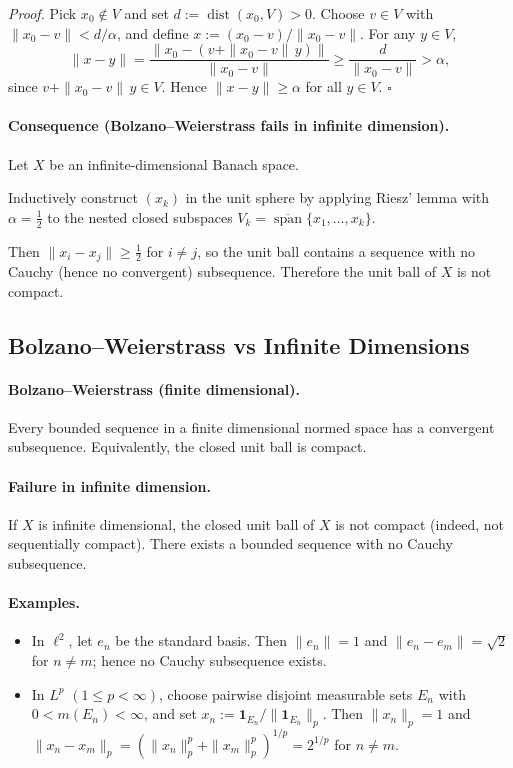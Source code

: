 \documentclass[12pt,a4paper]{article}
\newcommand{\qed}{\hfill$\square$}
\theoremstyle{plain}
\theoremstyle{definition}
\theoremstyle{remark}
\theoremstyle{remark}
\theoremstyle{definition}
\begin{document}
	\emph{Proof.}
	Pick $x_{0}\notin V$ and set $d:=\operatorname{dist}(x_{0},V)>0$.
	Choose $v\in V$ with $\|x_{0}-v\|<d/\alpha$, and define $x:=(x_{0}-v)/\|x_{0}-v\|$.
	For any $y\in V$,
	\[
	\|x-y\|
	=\frac{\|x_{0}-(v+\|x_{0}-v\|\,y)\|}{\|x_{0}-v\|}
	\ge \frac{d}{\|x_{0}-v\|}>\alpha,
	\]
	since $v+\|x_{0}-v\|\,y\in V$. Hence $\|x-y\|\ge\alpha$ for all $y\in V$.
	\qed
	
	\paragraph{Consequence (Bolzano--Weierstrass fails in infinite dimension).}
	Let $X$ be an infinite-dimensional Banach space.
	
	Inductively construct $(x_{k})$ in the unit sphere by applying Riesz' lemma with $\alpha=\tfrac12$
	to the nested closed subspaces $V_{k}=\overline{\operatorname{span}}\{x_{1},\dots,x_{k}\}$.
	
	Then $\|x_{i}-x_{j}\|\ge\tfrac12$ for $i\ne j$, so the unit ball contains a sequence with no
	Cauchy (hence no convergent) subsequence. Therefore the unit ball of $X$ is not compact.
	
	\subsection*{Bolzano--Weierstrass vs Infinite Dimensions}
	
	\paragraph{Bolzano--Weierstrass (finite dimensional).}
	Every bounded sequence in a finite dimensional normed space has a convergent subsequence.
	Equivalently, the closed unit ball is compact.
	
	\paragraph{Failure in infinite dimension.}
	If $X$ is infinite dimensional, the closed unit ball of $X$ is not compact (indeed, not sequentially compact).
	There exists a bounded sequence with no Cauchy subsequence.
	
	\paragraph{Examples.}
	\begin{itemize}
		\item In $\ell^2$, let $e_n$ be the standard basis. Then $\|e_n\|=1$ and
		$\|e_n-e_m\|=\sqrt{2}$ for $n\neq m$; hence no Cauchy subsequence exists.
		\item In $L^p$ $(1\le p<\infty)$, choose pairwise disjoint measurable sets $E_n$ with $0<m(E_n)<\infty$, and set
		$x_n:=\mathbf 1_{E_n}/\|\mathbf 1_{E_n}\|_p$. Then $\|x_n\|_p=1$ and
		$\|x_n-x_m\|_p=(\|x_n\|_p^p+\|x_m\|_p^p)^{1/p}=2^{1/p}$ for $n\ne m$.
	\end{itemize}
	
\end{document}
